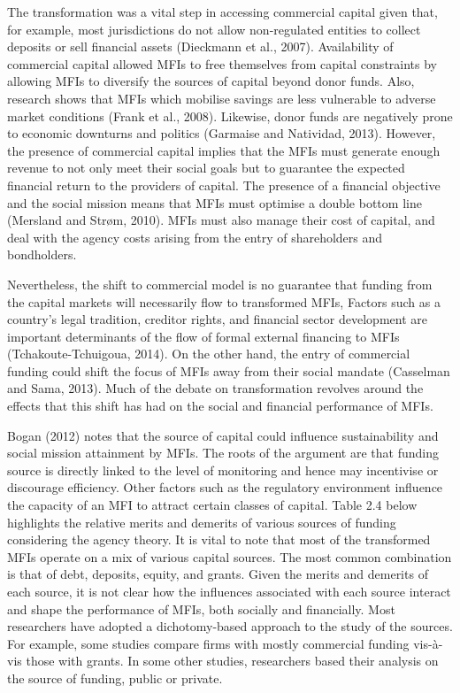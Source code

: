 \documentclass[a4paper, nobind]{templates/ociamthesis}
\begin{document}
The transformation was a vital step in accessing commercial capital given that, for example, most jurisdictions do not allow non-regulated entities to collect deposits or sell financial assets (Dieckmann et al., 2007). Availability of commercial capital allowed MFIs to free themselves from capital constraints by allowing MFIs to diversify the sources of capital beyond donor funds. Also, research shows that MFIs which mobilise savings are less vulnerable to adverse market conditions (Frank et al., 2008). Likewise, donor funds are negatively prone to economic downturns and politics (Garmaise and Natividad, 2013). However, the presence of commercial capital implies that the MFIs must generate enough revenue to not only meet their social goals but to guarantee the expected financial return to the providers of capital. The presence of a financial objective and the social mission means that MFIs must optimise a double bottom line (Mersland and Strøm, 2010). MFIs must also manage their cost of capital, and deal with the agency costs arising from the entry of shareholders and bondholders.

Nevertheless, the shift to commercial model is no guarantee that funding from the capital markets will necessarily flow to transformed MFIs, Factors such as a country's legal tradition, creditor rights, and financial sector development are important determinants of the flow of formal external financing to MFIs (Tchakoute-Tchuigoua, 2014). On the other hand, the entry of commercial funding could shift the focus of MFIs away from their social mandate (Casselman and Sama, 2013). Much of the debate on transformation revolves around the effects that this shift has had on the social and financial performance of MFIs.

Bogan (2012) notes that the source of capital could influence sustainability and social mission attainment by MFIs. The roots of the argument are that funding source is directly linked to the level of monitoring and hence may incentivise or discourage efficiency. Other factors such as the regulatory environment influence the capacity of an MFI to attract certain classes of capital. Table 2.4 below highlights the relative merits and demerits of various sources of funding considering the agency theory.
It is vital to note that most of the transformed MFIs operate on a mix of various capital sources. The most common combination is that of debt, deposits, equity, and grants. Given the merits and demerits of each source, it is not clear how the influences associated with each source interact and shape the performance of MFIs, both socially and financially. Most researchers have adopted a dichotomy-based approach to the study of the sources. For example, some studies compare firms with mostly commercial funding vis-à-vis those with grants. In some other studies, researchers based their analysis on the source of funding, public or private.
\end{document}
